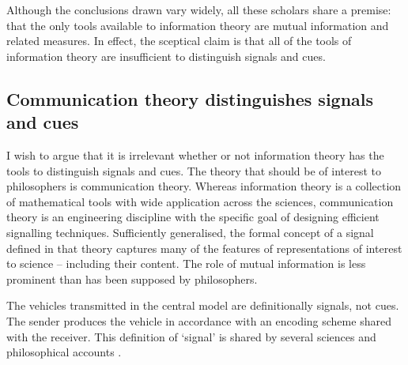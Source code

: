 Although the conclusions drawn vary widely, all these scholars share a premise: that the only tools available to information theory are mutual information and related measures.
In effect, the sceptical claim is that all of the tools of information theory are insufficient to distinguish signals and cues.


\subsection{Communication theory distinguishes signals and cues}

I wish to argue that it is irrelevant whether or not information theory has the tools to distinguish signals and cues.
The theory that should be of interest to philosophers is communication theory.
Whereas information theory is a collection of mathematical tools with wide application across the sciences, communication theory is an engineering discipline with the specific goal of designing efficient signalling techniques.
Sufficiently generalised, the formal concept of a signal defined in that theory captures many of the features of representations of interest to science -- including their content.
The role of mutual information is less prominent than has been supposed by philosophers.

The vehicles transmitted in the central model are definitionally signals, not cues.
The sender produces the vehicle in accordance with an encoding scheme shared with the receiver.
This definition of `signal' is shared by several sciences \citep{shannon1948mathematicala,maynardsmith2003animal} and philosophical accounts \citep[$\S$6]{millikan2004varieties} \citep{bergstrom2011transmission}.

